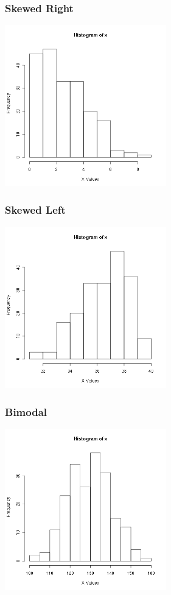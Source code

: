 \begin{frame}
  \frametitle{Skewed Right}

  \includegraphics[width=7cm]{img/skewedRightW1D2}

\end{frame}


\begin{frame}
  \frametitle{Skewed Left}

  \includegraphics[width=7cm]{img/skewedLeftW1D2}

\end{frame}


\begin{frame}
  \frametitle{Bimodal}

  \includegraphics[width=7cm]{img/bimodalW1D2}

\end{frame}


